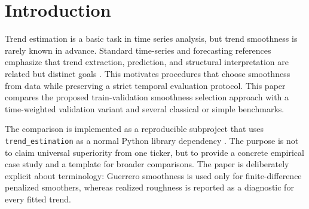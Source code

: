 \section{Introduction}
Trend estimation is a basic task in time series analysis, but trend smoothness
is rarely known in advance. Standard time-series and forecasting references
emphasize that trend extraction, prediction, and structural interpretation are
related but distinct goals \citep{chatfield2003analysis,brockwell2016introduction,
hamilton1994timeseries,makridakis1998forecasting}. This motivates procedures
that choose smoothness from data while preserving a strict temporal evaluation
protocol. This paper compares the proposed train-validation smoothness
selection approach with a time-weighted validation variant and several
classical or simple benchmarks.

The comparison is implemented as a reproducible subproject that uses
\texttt{trend\_estimation} as a normal Python library dependency
\citep{trendestimation}. The purpose is not to claim universal superiority from
one ticker, but to provide a concrete empirical case study and a template for
broader comparisons. The paper is deliberately explicit about terminology:
Guerrero smoothness is used only for finite-difference penalized smoothers,
whereas realized roughness is reported as a diagnostic for every fitted trend.
